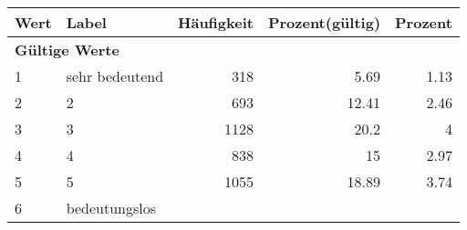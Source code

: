      \begin{longtable}{lXrrr}
     \toprule
     \textbf{Wert} & \textbf{Label} & \textbf{Häufigkeit} & \textbf{Prozent(gültig)} & \textbf{Prozent} \\
     \endhead
     \midrule
     \multicolumn{5}{l}{\textbf{Gültige Werte}}\\

     1 &
     \multicolumn{1}{X}{ sehr bedeutend   } &


       \num{318} &
       \num[round-mode=places,round-precision=2]{5,69} &
         \num[round-mode=places,round-precision=2]{1,13} \\

     2 &
     \multicolumn{1}{X}{ 2   } &


       \num{693} &
       \num[round-mode=places,round-precision=2]{12,41} &
         \num[round-mode=places,round-precision=2]{2,46} \\

     3 &
     \multicolumn{1}{X}{ 3   } &


       \num{1128} &
       \num[round-mode=places,round-precision=2]{20,2} &
         \num[round-mode=places,round-precision=2]{4} \\

     4 &
     \multicolumn{1}{X}{ 4   } &


       \num{838} &
       \num[round-mode=places,round-precision=2]{15} &
         \num[round-mode=places,round-precision=2]{2,97} \\

     5 &
     \multicolumn{1}{X}{ 5   } &


       \num{1055} &
       \num[round-mode=places,round-precision=2]{18,89} &
         \num[round-mode=places,round-precision=2]{3,74} \\

     6 &
     \multicolumn{1}{X}{ bedeutungslos   } &



\end{longtable}
